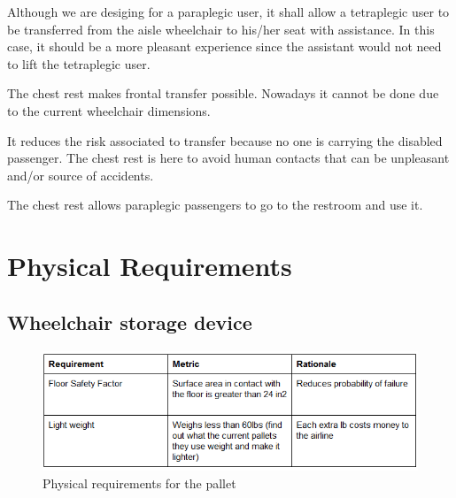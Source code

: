 \begin{list}{-}{}
  \item Although we are desiging for a paraplegic user, it shall allow a tetraplegic user to be transferred from the aisle wheelchair to his/her seat with assistance. In this case, it should be a more pleasant experience since the assistant would not need to lift the tetraplegic user.
  \item The chest rest makes frontal transfer possible. Nowadays it cannot be done due to the current wheelchair dimensions.
  \item It reduces the risk associated to transfer because no one is carrying the disabled passenger. The chest rest is here to avoid human contacts that can be unpleasant and/or source of accidents.
  \item The chest rest allows paraplegic passengers to go to the restroom and use it.
\end{list}

\newpage

\section{Physical Requirements}

\subsection*{Wheelchair storage device}

\begin{figure}[h!]
  \centering
     \includegraphics[scale=1]{images/physical_requirements_pallet.png}
   \caption{Physical requirements for the pallet}
  \label{fig:phy_req_pallet}
\end{figure}

\newpage

